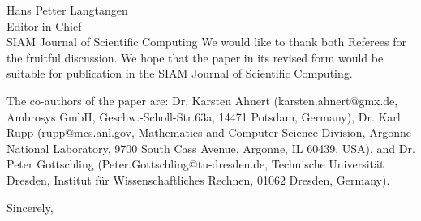 \documentclass[a4paper,11pt]{letter}
\begin{document}
\begin{letter}{
    Hans Petter Langtangen\\
    Editor-in-Chief\\
    SIAM Journal of Scientific Computing
    }
We would like to thank both Referees for the fruitful discussion. We hope that
the paper in its revised form would be suitable for publication in the SIAM
Journal of Scientific Computing.


The co-authors of the paper are: Dr. Karsten Ahnert (karsten.ahnert@gmx.de,
Ambrosys GmbH, Geschw.-Scholl-Str.63a, 14471 Potsdam, Germany), Dr. Karl Rupp
(rupp@mcs.anl.gov, Mathematics and Computer Science Division, Argonne National
Laboratory, 9700 South Cass Avenue, Argonne, IL 60439, USA), and Dr. Peter
Gottschling (Peter.Gottschling@tu-dresden.de, Technische Universit\"at Dresden,
Institut f\"ur Wissenschaftliches Rechnen, 01062 Dresden, Germany).

\closing{Sincerely,}

\end{letter}
\end{document}

